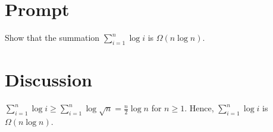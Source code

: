 \documentclass[11pt]{article}
\begin{document}
    \section{Prompt}\label{sec:prompt}

    Show that the summation $\sum^n_{i=1} \log i$ is $\Omega(n\log n)$.

    \pagebreak

    \section{Discussion}\label{sec:discussion}

    $\sum^n_{i=1} \log i \geq \sum^n_{i=1} \log \sqrt{n} = \frac{n}{2} \log n$ for $n \geq 1$. Hence, $\sum^n_{i=1} \log i$ is $\Omega(n\log n)$.
\end{document}
